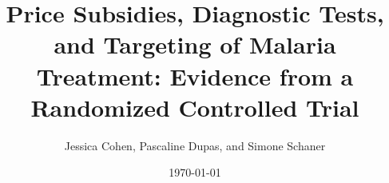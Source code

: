 \documentclass{beamer}
\begin{document}
\title{Price Subsidies, Diagnostic Tests, and Targeting of Malaria Treatment: Evidence from a Randomized Controlled Trial}
\author{Jessica Cohen, Pascaline Dupas, and Simone Schaner}
\date{\today}

\frame{\titlepage}
\end{document}
